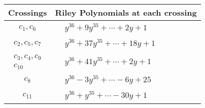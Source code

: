 \documentclass[1p]{elsarticle_modified}
\theoremstyle{definition}
\begin{document}
\begin{tabular}{m{50pt}|m{274pt}}
Crossings & \hspace{64pt}Riley Polynomials at each crossing \\
\hline $$\begin{aligned}c_{1},c_{6}\end{aligned}$$&$\begin{aligned}
&y^{36}+9 y^{35}+\cdots+2 y+1
\end{aligned}$\\
\hline $$\begin{aligned}c_{2},c_{5},c_{7}\end{aligned}$$&$\begin{aligned}
&y^{36}+37 y^{35}+\cdots+18 y+1
\end{aligned}$\\
\hline $$\begin{aligned}c_{3},c_{4},c_{9}\\c_{10}\end{aligned}$$&$\begin{aligned}
&y^{36}+41 y^{35}+\cdots+2 y+1
\end{aligned}$\\
\hline $$\begin{aligned}c_{8}\end{aligned}$$&$\begin{aligned}
&y^{36}-3 y^{35}+\cdots-6 y+25
\end{aligned}$\\
\hline $$\begin{aligned}c_{11}\end{aligned}$$&$\begin{aligned}
&y^{36}+y^{35}+\cdots-30 y+1
\end{aligned}$\\
\hline
\end{tabular}
\vskip 2pc
\end{document}
